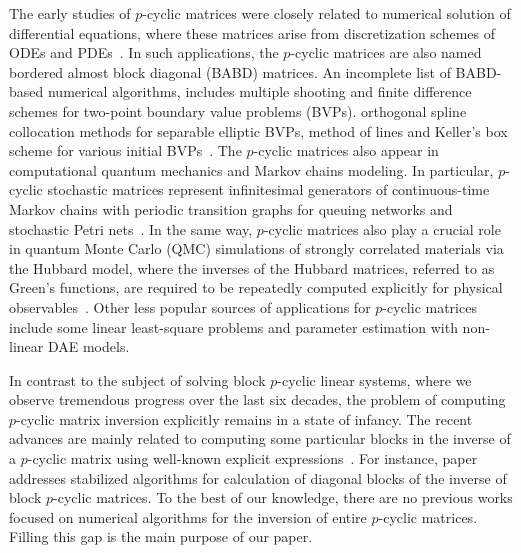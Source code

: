 \documentclass{llncs}
\begin{document}
The early studies of $p$-cyclic matrices 
were closely related to numerical solution of differential equations, 
where these matrices arise from discretization schemes of ODEs
and PDEs~\cite{Wright93,Wright92BSOF,Fairweather04}.
In such applications, the $p$-cyclic matrices are also named bordered almost block diagonal 
(BABD) matrices. 
An incomplete list of 
BABD-based numerical algorithms,  
includes multiple shooting and finite difference schemes
for two-point boundary value problems (BVPs).
orthogonal spline collocation methods for separable elliptic BVPs, 
method of lines and Keller's box scheme for various initial BVPs~\cite{Wright92BSOF,Fairweather04}.
%
The $p$-cyclic matrices also appear in 
computational quantum mechanics and Markov chains modeling. 
In particular, $p$-cyclic stochastic 
matrices represent infinitesimal generators of continuous-time 
Markov chains with periodic transition graphs for queuing networks 
and stochastic Petri nets~\cite{Ernst00}. %
In the same way, $p$-cyclic matrices also play a crucial role in 
quantum Monte Carlo (QMC) simulations of strongly correlated 
materials via the Hubbard model, where the inverses of 
the Hubbard matrices, referred to as Green's functions, are required 
to be repeatedly computed explicitly for 
physical observables~\cite{Bai09,Tomas12}. %
Other less popular sources of applications for $p$-cyclic matrices include
some linear least-square problems and 
parameter estimation with non-linear DAE models.

In contrast to the subject of solving block $p$-cyclic linear systems, 
where we observe tremendous progress over the last six decades,
the problem of computing $p$-cyclic matrix inversion explicitly remains in 
a state of infancy. The recent advances are mainly related to 
computing some particular blocks in the inverse of a $p$-cyclic matrix
using well-known explicit expressions~\cite{Bai09,Tomas12}.
For instance, paper~\cite{Tomas12} addresses stabilized algorithms for 
calculation of diagonal blocks of the inverse of block $p$-cyclic matrices. 
To the best of our knowledge, there are no previous works 
focused on numerical algorithms for the inversion of entire 
$p$-cyclic matrices.
Filling this gap is the main purpose of our paper. 
\end{document}

